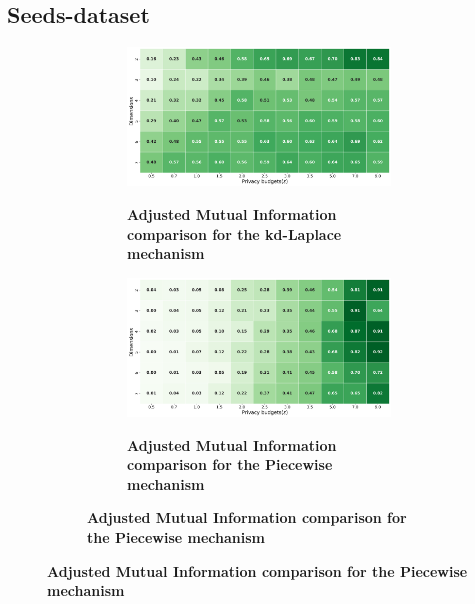 \subsection{Seeds-dataset}
\begin{figure}[H]
      \centering
      \begin{subfigure}[b]{0.90\textwidth}
            \begin{subfigure}[c]{1\textwidth}
                  \caption{\textbf{Adjusted Mutual Information comparison for the kd-Laplace mechanism}}
                  \includegraphics[width=1\textwidth]{Results/kd-laplace/kd-Laplace/seeds-dataset/ami.png}
                  \label{fig:ami_seeds-dataset_comparison_kdlaplace_2d}
            \end{subfigure}
            \vfill %
            \begin{subfigure}[c]{1\textwidth}
                  \caption{\textbf{Adjusted Mutual Information comparison for the Piecewise mechanism}}
                  \includegraphics[width=1\textwidth]{Results/kd-laplace/piecewise/seeds-dataset/ami.png}
                  \label{fig:ami_seeds-dataset_comparison_piecewise_2d}
            \end{subfigure}

\end{subfigure}
\end{figure}
